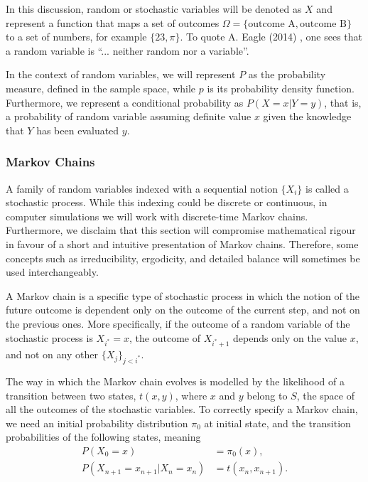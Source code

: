 In this discussion, random or stochastic variables will be denoted as $X$ and represent a function that maps a set of outcomes $\Omega=\{\text{outcome A}, \text{outcome B}\}$ to a set of numbers, for example $\{23, \pi\}$. To quote A. Eagle (2014) \cite{chancevrandomness}, one sees that a random variable is ``... neither random nor a variable''.

In the context of random variables, we will represent $P$ as the probability measure, defined in the sample space, while $p$ is its probability density function. Furthermore, we represent a conditional probability as $P(X=x | Y=y)$, that is, a probability of random variable assuming definite value $x$ given the knowledge that $Y$ has been evaluated $y$.

\subsubsection{Markov Chains}

A family of random variables indexed with a sequential notion $\{X_i\}$ is called a stochastic process. While this indexing could be discrete or continuous, in computer simulations we will work with discrete-time Markov chains. Furthermore, we disclaim that this section will compromise mathematical rigour in favour of a short and intuitive presentation of Markov chains. Therefore, some concepts such as irreducibility, ergodicity, and detailed balance will sometimes be used interchangeably.

A Markov chain is a specific type of stochastic process in which the notion of the future outcome is dependent only on the outcome of the current step, and not on the previous ones. More specifically, if the outcome of a random variable of the stochastic process is $X_{i^*} = x$, the outcome of $X_{i^* + 1}$ depends only on the value $x$, and not on any other $\{X_{j}\}_{j < i^*}$.

The way in which the Markov chain evolves is modelled
by the likelihood of a transition between two states, $t(x, y)$, where $x$ and $y$ belong to $S$, the space of all the outcomes of the stochastic variables. To correctly specify a Markov chain, we need an initial probability distribution $\pi_0$ at initial state, and the transition probabilities of the following states, meaning 
\begin{align*}
    P(X_0 = x) &= \pi_0(x), \\
    P(X_{n+1} = x_{n+1} | X_n = x_n) &= t(x_n, x_{n+1}).
\end{align*}

